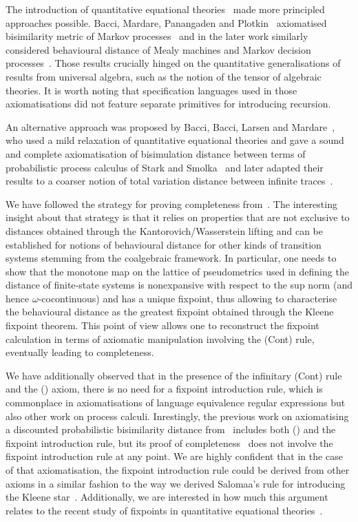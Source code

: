 The introduction of quantitative equational theories~\cite{Mardare:2016:Quantitative} made more principled approaches possible. Bacci, Mardare, Panangaden and Plotkin~\cite{Bacci:2018:Algebraic} axiomatised bisimilarity metric of Markov processes~\cite{Desharnais:2004:Metrics} and in the later work similarly considered behavioural distance of Mealy machines and Markov decision processes~\cite{Bacci:2024:Sum}. Those results crucially hinged on the quantitative generalisations of results from universal algebra, such as the notion of the tensor of algebraic theories. It is worth noting that specification languages used in those axiomatisations did not feature separate primitives for introducing recursion.

An alternative approach was proposed by Bacci, Bacci, Larsen and Mardare~\cite{Bacci:2018:Bisimilarity}, who used a mild relaxation of quantitative equational theories and gave a sound and complete axiomatisation of bisimulation distance between terms of probabilistic process calculus of Stark and Smolka~\cite{Stark:2000:Complete} and later adapted their results to a coarser notion of total variation distance between infinite traces~\cite{Bacci:2018:TV}. 

We have followed the strategy for proving completeness from~\cite{Bacci:2018:Bisimilarity}. The interesting insight about that strategy is that it relies on properties that are not exclusive to distances obtained through the Kantorovich/Wasserstein lifting and can be established for notions of behavioural distance for other kinds of transition systems stemming from the coalgebraic framework. In particular, one needs to show that the monotone map on the lattice of pseudometrics used in defining the distance of finite-state systems is nonexpansive with respect to the sup norm (and hence $\omega$-cocontinuous) and has a unique fixpoint, thus allowing to characterise the behavioural distance as the greatest fixpoint obtained through the Kleene fixpoint theorem. This point of view allows one to reconstruct the fixpoint calculation in terms of axiomatic manipulation involving the \textsf{(Cont)} rule, eventually leading to completeness.

We have additionally observed that in the presence of the infinitary \textsf{(Cont)} rule and the \textsf{(\dPref)} axiom, there is no need for a fixpoint introduction rule, which is commonplace in axiomatisations of language equivalence regular expressions but also other work on process calculi. Inrestingly, the previous work on axiomatising a discounted probabilistic bisimilarity distance from~\cite{Bacci:2018:Bisimilarity} includes both \textsf{(\dPref)} and the fixpoint introduction rule, but its proof of completeness~\cite[Theorem~6.4]{Bacci:2018:Bisimilarity} does not involve the fixpoint introduction rule at any point. We are highly confident that in the case of that axiomatisation, the fixpoint introduction rule could be derived from other axioms in a similar fashion to the way we derived Salomaa's rule for introducing the Kleene star~\cite{Salomaa:1966:Two}. Additionally, we are interested in how much this argument relates to the recent study of fixpoints in quantitative equational theories~\cite{Mardare:2021:Fixed}. 

